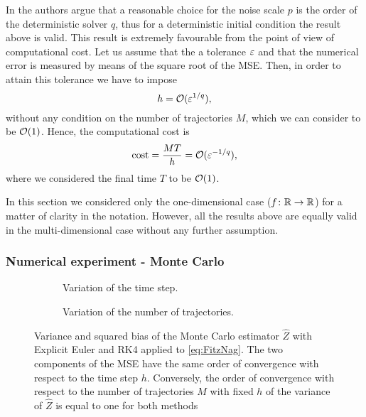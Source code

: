 \begin{remark} In \cite{CGS16} the authors argue that a reasonable choice for the noise scale $p$ is the order of the deterministic solver $q$, thus for a deterministic initial condition the result above is valid. This result is extremely favourable from the point of view of computational cost. Let us assume that the a tolerance $\varepsilon$ and that the numerical error is measured by means of the square root of the MSE. Then, in order to attain this tolerance we have to impose
\begin{equation}
	h = \mathcal{O}(\varepsilon^{1/q}),
\end{equation}
without any condition on the number of trajectories $M$, which we can consider to be $\mathcal{O}(1)$. Hence, the computational cost is 
\begin{equation}
	\mathrm{cost} = \frac{MT}{h} = \mathcal{O}(\varepsilon^{-1/q}),
\end{equation}
where we considered the final time $T$ to be $\mathcal{O}(1)$.
\end{remark}
\begin{remark} In this section we considered only the one-dimensional case ($f\colon \mathbb{R}\to\mathbb{R}$) for a matter of clarity in the notation. However, all the results above are equally valid in the multi-dimensional case without any further assumption.
\end{remark}

\subsubsection{Numerical experiment - Monte Carlo}

\begin{figure}
\centering
\begin{subfigure}{0.49\linewidth}
	\centering
	\resizebox{1.0\linewidth}{!}{}
	\caption{Variation of the time step.}
	\label{fig:MonteCarloVarianceH}
\end{subfigure}
\begin{subfigure}{0.49\linewidth}
	\centering
	\resizebox{1.0\linewidth}{!}{}
	\caption{Variation of the number of trajectories.}
	\label{fig:MonteCarloVarianceM}
\end{subfigure}
\caption{Variance and squared bias of the Monte Carlo estimator $\hat Z$ with Explicit Euler and RK4 applied to \eqref{eq:FitzNag}. The two components of the MSE have the same order of convergence with respect to the time step $h$. Conversely, the order of convergence with respect to the number of trajectories $M$ with fixed $h$ of the variance of $\hat Z$ is equal to one for both methods}
\label{fig:MonteCarloVariance}
\end{figure}


